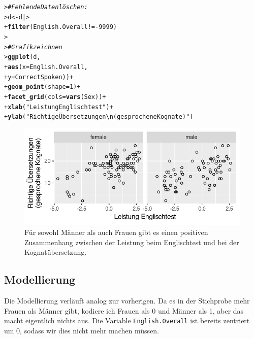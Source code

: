 \documentclass[oneside, 10pt]{book}\usepackage[]{graphicx}\usepackage[]{xcolor}
\makeatletter
\newcommand{\hlnum}[1]{\textcolor[rgb]{0.686,0.059,0.569}{#1}}%
\newcommand{\hlstr}[1]{\textcolor[rgb]{0.192,0.494,0.8}{#1}}%
\newcommand{\hlcom}[1]{\textcolor[rgb]{0.678,0.584,0.686}{\textit{#1}}}%
\newcommand{\hlopt}[1]{\textcolor[rgb]{0,0,0}{#1}}%
\newcommand{\hlstd}[1]{\textcolor[rgb]{0.345,0.345,0.345}{#1}}%
\newcommand{\hlkwb}[1]{\textcolor[rgb]{0.69,0.353,0.396}{#1}}%
\newcommand{\hlkwc}[1]{\textcolor[rgb]{0.333,0.667,0.333}{#1}}%
\newcommand{\hlkwd}[1]{\textcolor[rgb]{0.737,0.353,0.396}{\textbf{#1}}}%
\newenvironment{kframe}{%
 \def\at@end@of@kframe{}%
 \ifinner\ifhmode%
  \def\at@end@of@kframe{\end{minipage}}%
  \begin{minipage}{\columnwidth}%
 \fi\fi%
 \def\FrameCommand##1{\hskip\@totalleftmargin \hskip-\fboxsep
 \colorbox{shadecolor}{##1}\hskip-\fboxsep
     \hskip-\linewidth \hskip-\@totalleftmargin \hskip\columnwidth}%
 \MakeFramed {\advance\hsize-\width
   \@totalleftmargin\z@ \linewidth\hsize
   \@setminipage}}%
 {\par\unskip\endMakeFramed%
 \at@end@of@kframe}
\newenvironment{knitrout}{}{} %
\makeatother
\begin{document}
\begin{knitrout}
\color{fgcolor}\begin{kframe}
\begin{alltt}
\hlstd{> }\hlcom{# Fehlende Daten löschen:}
\hlstd{> }\hlstd{d} \hlkwb{<-} \hlstd{d |>}
\hlstd{+ }  \hlkwd{filter}\hlstd{(English.Overall} \hlopt{!= -}\hlnum{9999}\hlstd{)}
\hlstd{> }
\hlstd{> }\hlcom{# Grafik zeichnen}
\hlstd{> }\hlkwd{ggplot}\hlstd{(d,}
\hlstd{+ }       \hlkwd{aes}\hlstd{(}\hlkwc{x} \hlstd{= English.Overall,}
\hlstd{+ }           \hlkwc{y} \hlstd{= CorrectSpoken))} \hlopt{+}
\hlstd{+ }  \hlkwd{geom_point}\hlstd{(}\hlkwc{shape} \hlstd{=} \hlnum{1}\hlstd{)} \hlopt{+}
\hlstd{+ }  \hlkwd{facet_grid}\hlstd{(}\hlkwc{cols} \hlstd{=} \hlkwd{vars}\hlstd{(Sex))} \hlopt{+}
\hlstd{+ }  \hlkwd{xlab}\hlstd{(}\hlstr{"Leistung Englischtest"}\hlstd{)} \hlopt{+}
\hlstd{+ }  \hlkwd{ylab}\hlstd{(}\hlstr{"Richtige Übersetzungen\textbackslash{}n(gesprochene Kognate)"}\hlstd{)}
\end{alltt}
\end{kframe}\begin{figure}[tp]

{\centering \includegraphics[width=.7\textwidth]{figs/unnamed-chunk-295-1} 

}

\caption{Für sowohl Männer als auch Frauen gibt es einen positiven Zusammenhang zwischen der Leistung beim Englischtest und bei der Kognatübersetzung.\label{fig:engl}}\label{fig:unnamed-chunk-295}
\end{figure}

\end{knitrout}

\subsection{Modellierung}
Die Modellierung verläuft analog zur vorherigen.
Da es in der Stichprobe mehr Frauen als Männer gibt,
kodiere ich Frauen als 0 und Männer als 1, aber das macht
eigentlich nichts aus. Die
Variable \texttt{English.Overall} ist bereits zentriert
um 0, sodass wir dies nicht mehr machen müssen.
\end{document}
